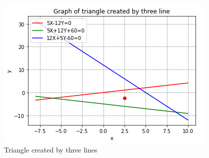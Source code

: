 \documentclass[journal,12pt,twocolumn]{IEEEtran}
\begin{document}
\begin{figure}
    
    \includegraphics[width=\columnwidth]{graph.png}
    \caption{Triangle created by three lines}
    \label{fig:assignment-2}
\end{figure}
\end{document}

